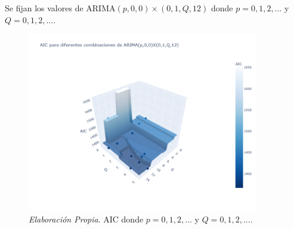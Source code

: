 \documentclass[12pt,letterpaper]{article}   %
\begin{document}
\newpage
Se fijan los valores de $\text{ARIMA}(p, 0, 0) \times (0, 1, Q, 12)$ donde $p = 0, 1, 2, \dots$ y $Q = 0, 1, 2, \dots$.
\begin{figure}[h!]
    \centering
    \includegraphics[width=0.9\textwidth]{imagenes/99-03.png}
    \caption{\textit{Elaboración Propia}. AIC donde $p = 0, 1, 2, \dots$ y $Q = 0, 1, 2, \dots$.}
    \label{fig:FAC_FACP_yeo}
\end{figure}
\end{document}
